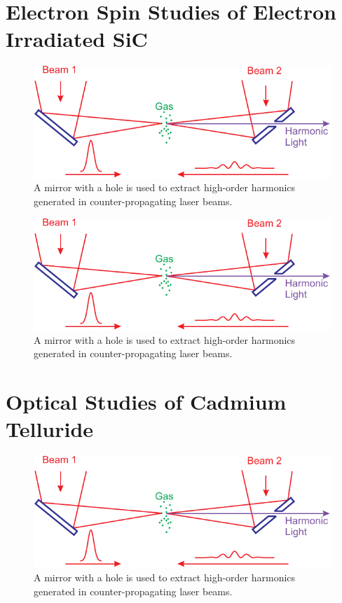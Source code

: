 \documentclass[oneside, astronomy, noacknowlegments]{BYUPhys}
\begin{document}
\begin{appendices}

\chapter{Electron Spin Studies of Electron Irradiated SiC}
\label{sec:appenda}

\begin{figure}
    \centerline{\includegraphics{Graphic1}}
    \caption[Electron-irradiated SiC lifetime  summary]{\label{fig:e17results}
     A mirror with a hole is used to extract high-order harmonics generated in
     counter-propagating laser beams.}
 \end{figure}

\begin{figure}
    \centerline{\includegraphics{Graphic1}}
    \caption[ODMR/Photoluminescence vs temperature]{\label{fig:ODMRPL}
     A mirror with a hole is used to extract high-order harmonics generated in
     counter-propagating laser beams.}
 \end{figure}

\chapter{Optical Studies of Cadmium Telluride}
\label{sec:appendb}


\begin{figure}
    \centerline{\includegraphics{Graphic1}}
    \caption[Photoluminescence of CdTe]{\label{fig:CdTePL}
     A mirror with a hole is used to extract high-order harmonics generated in
     counter-propagating laser beams.}
 \end{figure}


\end{appendices}
\end{document}
